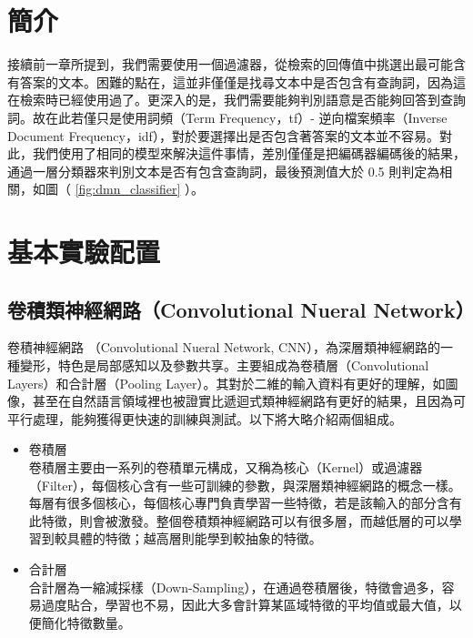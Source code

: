 \section{簡介}
接續前一章所提到，我們需要使用一個過濾器，從檢索的回傳值中挑選出最可能含有答案的文本。困難的點在，這並非僅僅是找尋文本中是否包含有查詢詞，因為這在檢索時已經使用過了。更深入的是，我們需要能夠判別語意是否能夠回答到查詢詞。故在此若僅只是使用詞頻（Term Frequency，tf）- 逆向檔案頻率（Inverse Document Frequency，idf），對於要選擇出是否包含著答案的文本並不容易。對此，我們使用了相同的模型來解決這件事情，差別僅僅是把編碼器編碼後的結果，通過一層分類器來判別文本是否有包含查詢詞，最後預測值大於 0.5 則判定為相關，如圖（ \ref{fig:dmn_classifier} ）。

\section{基本實驗配置}
\subsection{卷積類神經網路（Convolutional Nueral Network）}
卷積神經網路 \cite{sharif2014cnn}（Convolutional Nueral Network, CNN），為深層類神經網路的一種變形，特色是局部感知以及參數共享。主要組成為卷積層（Convolutional Layers）和合計層（Pooling Layer）。其對於二維的輸入資料有更好的理解，如圖像，甚至在自然語言領域裡也被證實比遞迴式類神經網路有更好的結果，且因為可平行處理，能夠獲得更快速的訓練與測試。以下將大略介紹兩個組成。
\begin{itemize}
    \itemsep - 2pt
    \item 卷積層\\
        卷積層主要由一系列的卷積單元構成，又稱為核心（Kernel）或過濾器（Filter），每個核心含有一些可訓練的參數，與深層類神經網路的概念一樣。每層有很多個核心，每個核心專門負責學習一些特徵，若是該輸入的部分含有此特徵，則會被激發。整個卷積類神經網路可以有很多層，而越低層的可以學習到較具體的特徵；越高層則能學到較抽象的特徵。
    \item 合計層 \\
        合計層為一縮減採樣（Down-Sampling），在通過卷積層後，特徵會過多，容易過度貼合，學習也不易，因此大多會計算某區域特徵的平均值或最大值，以便簡化特徵數量。
\end{itemize}

